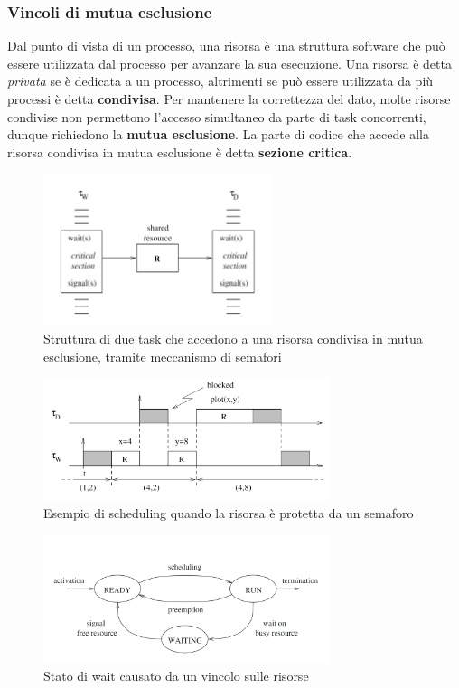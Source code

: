 \documentclass[12pt]{article}
\begin{document}
\subsubsection{Vincoli di mutua esclusione}
Dal punto di vista di un processo, una risorsa è una struttura software che può essere utilizzata dal processo per avanzare la sua esecuzione.
Una risorsa è detta \textit{privata} se è dedicata a un processo, altrimenti se può essere utilizzata da più processi è detta \textbf{condivisa}.
Per mantenere la correttezza del dato, molte risorse condivise non permettono l'accesso simultaneo da parte di task concorrenti, dunque richiedono la \textbf{mutua esclusione}.
La parte di codice che accede alla risorsa condivisa in mutua esclusione è detta \textbf{sezione critica}.
\begin{figure}[H]
    \centering
    \includegraphics[width=0.60\textwidth]{pictures/strutturaSezioneCritica.png}
    \caption{Struttura di due task che accedono a una risorsa condivisa in mutua esclusione, tramite meccanismo di semafori}
\end{figure}
\begin{figure}[H]
    \centering
    \includegraphics[width=0.75\textwidth]{pictures/schedulingCorsaCritica.png}
    \caption{Esempio di scheduling quando la risorsa è protetta da un semaforo}
\end{figure}
\begin{figure}[H]
    \centering
    \includegraphics[width=0.75\textwidth]{pictures/cicloWait.png}
    \caption{Stato di wait causato da un vincolo sulle risorse}
\end{figure}
\end{document}
